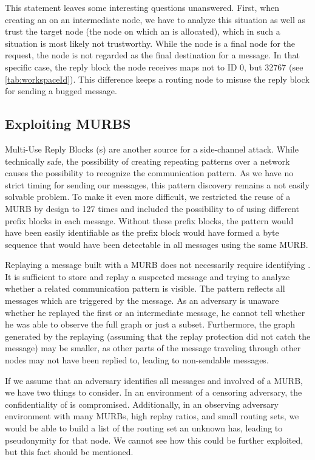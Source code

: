 This statement leaves some interesting questions unanswered. First, when creating an  on an intermediate node, we have to analyze this situation as well as trust the target node (the node on which an  is allocated), which in such a situation is most likely not trustworthy. While the node is a final node for the request, the node is not regarded as the final destination for a message. In that specific case, the reply block the node receives maps not to ID 0, but 32767 (see \cref{tab:workspaceId}). This difference keeps a routing node to misuse the reply block for sending a bugged message.

\subsection{Exploiting MURBS}
Multi-Use Reply Blocks (s) are another source for a side-channel attack. While technically safe, the possibility of creating repeating patterns over a network causes the possibility to recognize the communication pattern. As we have no strict timing for sending our messages, this pattern discovery remains a not easily solvable problem. To make it even more difficult, we restricted the reuse of a MURB by design to 127 times and included the possibility to of using different prefix blocks in each message. Without these prefix blocks, the pattern would have been easily identifiable as the prefix block would have formed a byte sequence that would have been detectable in all messages using the same MURB.

Replaying a message built with a MURB does not necessarily require identifying \VortexMessages{}. It is sufficient to store and replay a suspected message and trying to analyze whether a related communication pattern is visible. The pattern reflects all messages which are triggered by the message. As an adversary is unaware whether he replayed the first or an intermediate message, he cannot tell whether he was able to observe the full graph or just a subset. Furthermore, the graph generated by the replaying (assuming that the replay protection did not catch the message) may be smaller, as other parts of the message traveling through other nodes may not have been replied to, leading to non-sendable messages.

If we assume that an adversary identifies all messages and involved \VortexNodes{} of a MURB, we have two things to consider. In an environment of a censoring adversary, the confidentiality of \VortexNodes{} is compromised. Additionally, in an observing adversary environment with many MURBs, high replay ratios, and small routing sets, we would be able to build a list of the routing set an unknown \VortexNode{} has, leading to pseudonymity for that node. We cannot see how this could be further exploited, but this fact should be mentioned. 

